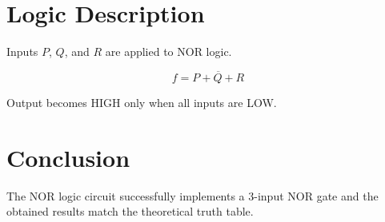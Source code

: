 \documentclass[12pt]{article}
\begin{document}
\section*{Logic Description}

Inputs $P$, $Q$, and $R$ are applied to NOR logic.

\[
f = \overline{P + Q + R}
\]

Output becomes HIGH only when all inputs are LOW.

\section*{Conclusion}

The NOR logic circuit successfully implements a 3-input NOR gate and the obtained results match the theoretical truth table.
\end{document}
